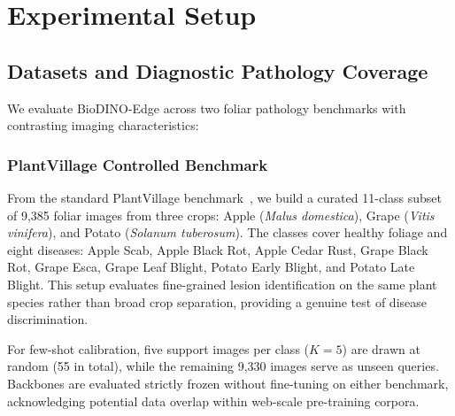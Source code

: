 \section{Experimental Setup}
\label{sec:experiments_setup}

\subsection{Datasets and Diagnostic Pathology Coverage}
\label{sec:datasets}
We evaluate BioDINO-Edge across two foliar pathology benchmarks with contrasting imaging characteristics:

\subsubsection{PlantVillage Controlled Benchmark}
From the standard PlantVillage benchmark~\cite{mohanty2016plantvillage}, we build a curated 11-class subset of 9{,}385 foliar images from three crops: Apple (\textit{Malus domestica}), Grape (\textit{Vitis vinifera}), and Potato (\textit{Solanum tuberosum}). The classes cover healthy foliage and eight diseases: Apple Scab, Apple Black Rot, Apple Cedar Rust, Grape Black Rot, Grape Esca, Grape Leaf Blight, Potato Early Blight, and Potato Late Blight. This setup evaluates fine-grained lesion identification on the same plant species rather than broad crop separation, providing a genuine test of disease discrimination.

For few-shot calibration, five support images per class ($K=5$) are drawn at random (55 in total), while the remaining 9{,}330 images serve as unseen queries. Backbones are evaluated strictly frozen without fine-tuning on either benchmark, acknowledging potential data overlap within web-scale pre-training corpora.

